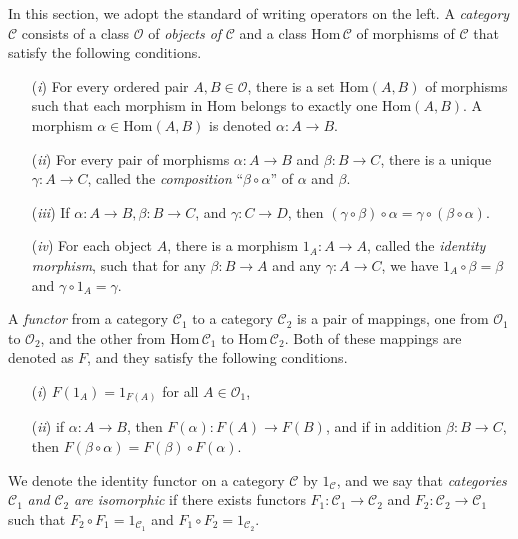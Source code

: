 \documentclass{surv-l}
\numberwithin{equation}{section}
\numberwithin{table}{section}
\numberwithin{figure}{section}
\theoremstyle{definition}
\begin{document}
In this section, we adopt the standard of writing operators on the
left. A \emph{category} $\mathcal{C}$ consists of a class
$\mathcal{O}$ of \emph{objects of} $\mathcal{C}$ and a class
$\mathrm{Hom}\,\mathcal{C}$ of morphisms of $\mathcal{C}$ that
satisfy the following conditions.
\begin{enumerate}
\item[(\emph{i})] For every ordered pair $A, B\in \mathcal{O}$, there is a
set $\mathrm{Hom}(A, B)$ of morphisms such that each
morphism in Hom belongs to exactly one $\mathrm{Hom}(A,
B)$. A morphism $\alpha\in \mathrm{Hom}(A, B)$ is denoted
$\alpha : A\rightarrow B$.

\item[(\emph{ii})] For every pair of morphisms $\alpha : A\rightarrow B$ and
$\beta : B\rightarrow C$, there is a unique $\gamma :
A\rightarrow C$, called the \emph{composition}
``$\beta\circ\alpha$'' of $\alpha$ and $\beta$.

\item[(\emph{iii})] If $\alpha : A\rightarrow B, \beta : B\rightarrow C$, and
$\gamma : C\rightarrow D$, then
$(\gamma\circ\beta)\circ\alpha=\gamma\circ(\beta\circ\alpha)$.

\item[(\emph{iv})] For each object $A$, there is a morphism $1_{A} :
A\rightarrow A$, called the \emph{identity
morphism}, such that for any
$\beta : B\rightarrow A$ and any $\gamma : A\rightarrow C$, we
have $1_{A}\circ \beta=\beta$ and $\gamma \circ 1_{A}=\gamma$.
\end{enumerate}

A \emph{functor} from a category $\mathcal{C}_{1}$ to a category
$\mathcal{C}_{2}$ is a pair of mappings, one from
$\mathcal{O}_{1}$ to $\mathcal{O}_{2}$, and the other from
$\mathrm{Hom}\,\mathcal{C}_{1}$ to $\mathrm{Hom}\,\mathcal{C}_{2}$. Both of
these mappings are denoted as $F$, and they satisfy the following
conditions.
\begin{enumerate}
\item[(\emph{i})] $F(1_{A})=1_{F(A)}$ for all $A\in \mathcal{O}_{1}$,

\item[(\emph{ii})] if $\alpha : A\rightarrow B$, then $F(\alpha) :
F(A)\rightarrow F(B)$, and if in addition $\beta :
B\rightarrow C$, then $F(\beta \circ
\alpha)=F(\beta)\circ F(\alpha)$.
\end{enumerate}

We denote the identity functor on a category $\mathcal{C}$ by
$1_{\mathcal{C}}$, and we say that \emph{categories}
$\mathcal{C}_{1}$ \emph{and} $\mathcal{C}_{2}$ \emph{are
isomorphic} if there exists functors $F_{1} :
\mathcal{C}_{1}\rightarrow \mathcal{C}_{2}$ and $F_{2} :
\mathcal{C}_{2}\rightarrow \mathcal{C}_{1}$ such that $F_{2}\circ
F_{1}=1_{\mathcal{C}_{1}}$ and $F_{1}\circ
F_{2}=1_{\mathcal{C}_{2}}$.
\end{document}
